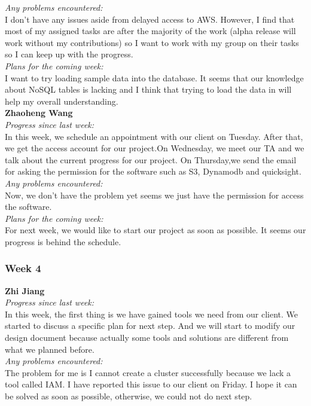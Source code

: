 \noindent\textit{Any problems encountered:}\\
I don't have any issues aside from delayed access to AWS. However, I find that most of my assigned tasks are after the majority of the work (alpha release will work without my contributions) so I want to work with my group on their tasks so I can keep up with the progress.\\

\noindent\textit{Plans for the coming week:}\\
I want to try loading sample data into the database. It seems that our knowledge about NoSQL tables is lacking and I think that trying to load the data in will help my overall understanding.\\

\noindent\textbf{Zhaoheng Wang}\\
\noindent\textit{Progress since last week:}\\
In this week, we schedule an appointment with our client on Tuesday. After that, we get the access account for our project.On Wednesday, we meet our TA and we talk about the current progress for our project. On Thursday,we send the email for asking the permission for the software such as S3, Dynamodb and quicksight.\\

\noindent\textit{Any problems encountered:}\\
Now, we don't have the problem yet seems we just have the permission for access the software.\\

\noindent\textit{Plans for the coming week:}\\
For next week, we would like to start our project as soon as possible. It seems our progress is behind the schedule.\\

\subsubsection{Week 4}
\textbf{Zhi Jiang}\\
\noindent\textit{Progress since last week:}\\
In this week, the first thing is we have gained tools we need from our client. We started to discuss a specific plan for next step. And we will start to modify our design document because actually some tools and solutions are different from what we planned before.\\

\noindent\textit{Any problems encountered:}\\
The problem for me is I cannot create a cluster successfully because we lack a tool called IAM. I have reported this issue to our client on Friday. I hope it can be solved as soon as possible, otherwise, we could not do next step.\\

